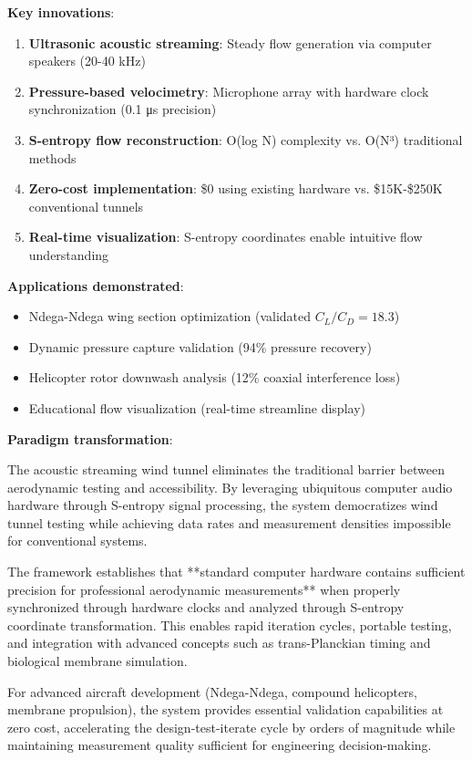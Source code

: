 \documentclass[12pt,a4paper]{article}
\begin{document}
\textbf{Key innovations}:
\begin{enumerate}
\item \textbf{Ultrasonic acoustic streaming}: Steady flow generation via computer speakers (20-40 kHz)
\item \textbf{Pressure-based velocimetry}: Microphone array with hardware clock synchronization (0.1 μs precision)
\item \textbf{S-entropy flow reconstruction}: O(log N) complexity vs. O(N³) traditional methods
\item \textbf{Zero-cost implementation}: \$0 using existing hardware vs. \$15K-\$250K conventional tunnels
\item \textbf{Real-time visualization}: S-entropy coordinates enable intuitive flow understanding
\end{enumerate}

\textbf{Applications demonstrated}:
\begin{itemize}
\item Ndega-Ndega wing section optimization (validated $C_L/C_D = 18.3$)
\item Dynamic pressure capture validation (94\% pressure recovery)
\item Helicopter rotor downwash analysis (12\% coaxial interference loss)
\item Educational flow visualization (real-time streamline display)
\end{itemize}

\textbf{Paradigm transformation}:

The acoustic streaming wind tunnel eliminates the traditional barrier between aerodynamic testing and accessibility. By leveraging ubiquitous computer audio hardware through S-entropy signal processing, the system democratizes wind tunnel testing while achieving data rates and measurement densities impossible for conventional systems.

The framework establishes that **standard computer hardware contains sufficient precision for professional aerodynamic measurements** when properly synchronized through hardware clocks and analyzed through S-entropy coordinate transformation. This enables rapid iteration cycles, portable testing, and integration with advanced concepts such as trans-Planckian timing and biological membrane simulation.

For advanced aircraft development (Ndega-Ndega, compound helicopters, membrane propulsion), the system provides essential validation capabilities at zero cost, accelerating the design-test-iterate cycle by orders of magnitude while maintaining measurement quality sufficient for engineering decision-making.
\end{document}
